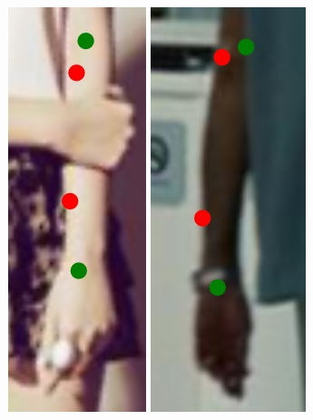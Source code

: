 \begin{figure}[!t]
    \includegraphics[height=\fh]{resources/Annotation_Correction/Fixing/fix_8}
    \hfill
    \includegraphics[height=\fh]{resources/Annotation_Correction/Fixing/fix_9}
    \hfill

\end{figure}
